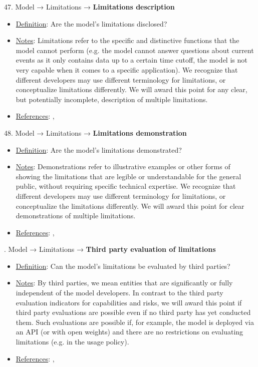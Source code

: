 47. Model → Limitations → \textbf{Limitations description}
\vspace{-\parskip}
\begin{itemize}
	\item
	\underline{Definition}: Are the model's limitations disclosed?
	\item
	\underline{Notes}: Limitations refer to the specific and distinctive functions that the model cannot perform (e.g. the model cannot answer questions about current events as it only contains data up to a certain time cutoff, the model is not very capable when it comes to a specific application). We recognize that different developers may use different terminology for limitations, or conceptualize limitations differently. We will award this point for any clear, but potentially incomplete, description of multiple limitations.
	\item
	\underline{References}: \citet{raji2022fallacy}, \citet{liang2022helm}
\end{itemize}


48. Model → Limitations → \textbf{Limitations demonstration}
\vspace{-\parskip}
\begin{itemize}
	\item
	\underline{Definition}: Are the model’s limitations demonstrated?
	\item
	\underline{Notes}: Demonstrations refer to illustrative examples or other forms of showing the limitations that are legible or understandable for the general public, without requiring specific technical expertise. We recognize that different developers may use different terminology for limitations, or conceptualize the limitations differently. We will award this point for clear demonstrations of multiple limitations.
	\item
	\underline{References}: \citet{raji2022fallacy}, \citet{liang2022helm}
\end{itemize}


. Model → Limitations → \textbf{Third party evaluation of limitations}
\vspace{-\parskip}
\begin{itemize}
	\item
	\underline{Definition}: Can the model’s limitations be evaluated by third parties?
	\item
	\underline{Notes}: By third parties, we mean entities that are significantly or fully independent of the model developers. In contrast to the third party evaluation indicators for capabilities and risks, we will award this point if third party evaluations are possible even if no third party has yet conducted them. Such evaluations are possible if, for example, the model is deployed via an API (or with open weights) and there are no restrictions on evaluating limitations (e.g. in the usage policy). 
	\item
	\underline{References}: \citet{raji2022audit}, \citet{liang2022helm}
\end{itemize}



